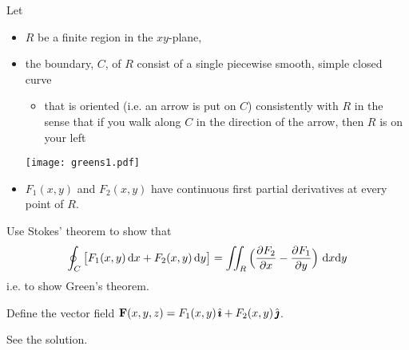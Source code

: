 \begin{question}
Let 
\begin{itemize}\itemsep1pt \parskip0pt  %
\item
$R$ be a finite region in the $xy$-plane,
\item
the boundary, $C$, of $R$ consist of a single piecewise smooth, simple closed curve
    \begin{itemize}\itemsep1pt \parskip0pt  %
     \item
     that is oriented (i.e. an arrow is put on $C$) consistently 
     with $R$ in the sense that if you walk along
     $C$ in the direction of the arrow, then $R$ is on your left
    \end{itemize}
     \begin{center}
        \texttt{[image: greens1.pdf]}
    \end{center}
\item
$F_1(x,y)$ and $F_2(x,y)$ have continuous first partial derivatives 
at every point of $R$.
\end{itemize}
Use Stokes' theorem to show that
\begin{equation*}
\oint_{C} \big[F_1(x,y)\,\dee{x} +F_2(x,y)\,\dee{y}\big]
 =\dblInt_{R}\Big(\frac{\partial F_2}{\partial x} 
                - \frac{\partial F_1}{\partial y}\Big)\ \dee{x}\dee{y}
\end{equation*}
i.e. to show Green's theorem.

\end{question}

\begin{hint} 
Define the vector field $\mathbf{F}(x,y,z) = F_1(x,y)\,\hat{\pmb{\imath}} +F_2(x,y)\,\hat{\pmb{\jmath}}$.
\end{hint}

\begin{answer} 
See the solution.
\end{answer}

